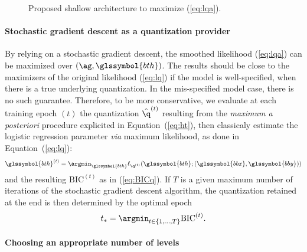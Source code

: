 \begin{figure}[h!]
\caption{Proposed shallow architecture to maximize (\ref{eq:lqa}).}
\label{fig:nn}
\end{figure}


\paragraph{Stochastic gradient descent as a quantization provider}

By relying on a stochastic gradient descent, the smoothed likelihood (\ref{eq:lqa}) can be maximized over $\left(\ag, \glssymbol{bth} \right)$. The results should be close to the maximizers of the original likelihood (\ref{eq:lq}) if the model is well-specified, when there is a true underlying quantization. In the mis-specified model case, there is no such guarantee. Therefore, to be more conservative, we evaluate at each training epoch $(t)$ the quantization $\hat{\q}^{(t)}$ resulting from the \textit{maximum a posteriori} procedure explicited in Equation~(\ref{eq:ht}), then classicaly estimate the logistic regression parameter \textit{via} maximum likelihood, as done in Equation~(\ref{eq:lq}):
\[\glssymbol{bth}^{(t)} = \argmin_{\glssymbol{bth}} \ell_{\q^{(t)}}(\glssymbol{bth}; (\glssymbol{bbx},\glssymbol{bby}))\]
and the resulting $\mbox{BIC}^{(t)}$ as in (\ref{eq:BICq}). If $T$ is a given maximum number of iterations of the stochastic gradient descent algorithm, the quantization retained at the end is then determined by the optimal epoch
\[t_*=\argmin_{t\in \{1,\ldots, T\}} \mbox{BIC}^{(t)}.\]
 
\paragraph{Choosing an appropriate number of levels}

